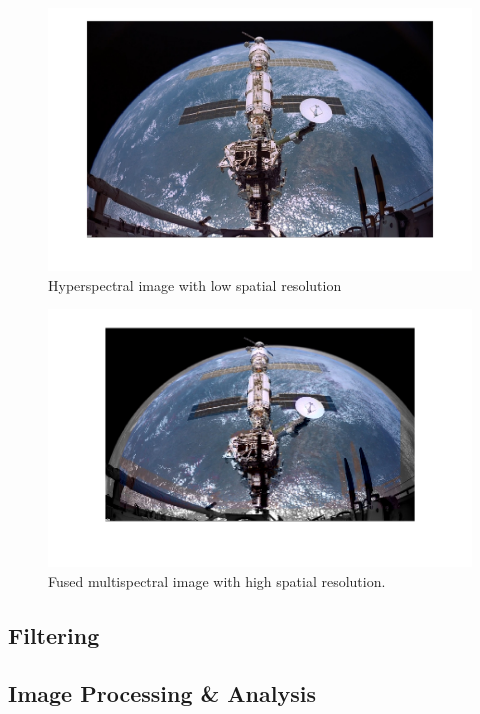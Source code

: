 \begin{figure}[H]
	\centering
		\includegraphics[scale=0.5]{images/Ihyp_lr.png}
		\caption{Hyperspectral image with low spatial resolution}
		\label{fig:hyp_lr}
\end{figure}


\begin{figure}[H]
	\centering
		\includegraphics[scale=0.5]{images/hrlrmixing.png}
		\caption{Fused multispectral image with high spatial resolution.}
		\label{fig:hrlrmixing}
\end{figure}


\subsection{Filtering}

\subsection{Image Processing \& Analysis}

